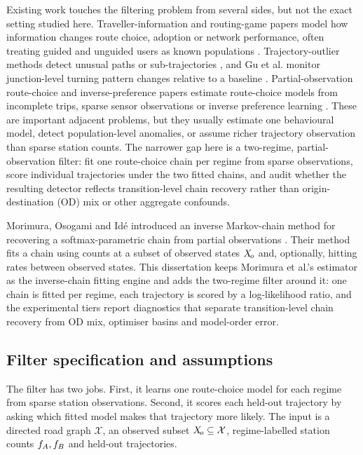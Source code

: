 Existing work touches the filtering problem from several sides, but not
the exact setting studied here. Traveller-information and routing-game
papers model how information changes route choice, adoption or network
performance, often treating guided and unguided users as known
populations \cite{yang2001atis,ramos2020information,acemoglu2018informational,cabannes2018gps}.
Trajectory-outlier methods detect unusual paths or sub-trajectories
\cite{lee2008trajectory}, and Gu et al. monitor junction-level turning
pattern changes relative to a baseline \cite{gu2018}. Partial-observation
route-choice and inverse-preference papers estimate route-choice models
from incomplete trips, sparse sensor observations or inverse preference
learning \cite{vanoijen2020sensor,mai2023incomplete,ziebart2008maxent}.
These are important adjacent problems, but they usually estimate one
behavioural model, detect population-level anomalies, or assume richer
trajectory observation than sparse station counts. The narrower gap here
is a two-regime, partial-observation filter: fit one route-choice chain
per regime from sparse observations, score individual trajectories under
the two fitted chains, and audit whether the resulting detector reflects
transition-level chain recovery rather than origin-destination (OD) mix
or other aggregate confounds.

Morimura, Osogami and Id\'e introduced an inverse Markov-chain method for
recovering a softmax-parametric chain from partial observations
\cite{morimura2013}. Their method fits a chain using counts at a subset
of observed states $X_{\!o}$ and, optionally, hitting rates between observed
states. This dissertation keeps Morimura et al.'s estimator as the
inverse-chain fitting engine and adds the two-regime filter around it:
one chain is fitted per regime, each trajectory is scored by a
log-likelihood ratio, and the experimental tiers report diagnostics that
separate transition-level chain recovery from OD mix, optimiser basins and
model-order error.

\subsection{Filter specification and assumptions}
\label{sec:intro-filter}\label{sec:methodology}\label{sec:filter-design}
\label{sec:morimura}\label{sec:morimura-formulation}\label{sec:loss-gradients}

The filter has two jobs. First, it learns one route-choice model for each
regime from sparse station observations. Second, it scores each held-out
trajectory by asking which fitted model makes that trajectory more likely.
The input is a directed road graph $\mathcal{X}$, an observed subset
$X_{\!o} \subseteq \mathcal{X}$, regime-labelled station counts
$f_A,f_B$ and held-out trajectories.

